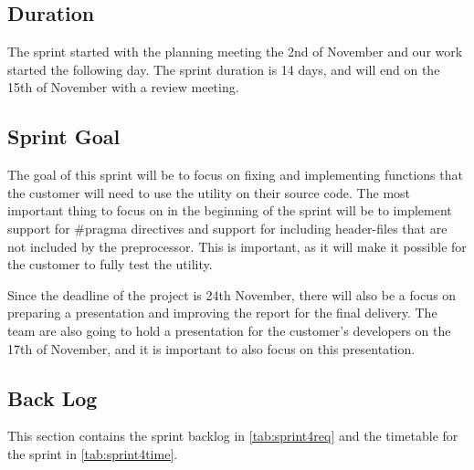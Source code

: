 \subsection{Duration}
The sprint started with the planning meeting the 2nd of November and our work started the following day. The sprint duration is 14 days, and will end on the 15th of November with a review meeting. 

\subsection{Sprint Goal}
The goal of this sprint will be to focus on fixing and implementing functions that the customer will need to use the \gls{utility} on their source code. The most important thing to focus on in the beginning of the sprint will be to implement support for \#pragma directives and support for including \gls{header}-files that are not included by the \gls{preprocessor}. This is important, as it will make it possible for the customer to fully test the \gls{utility}.

Since the deadline of the project is 24th November, there will also be a focus on preparing a presentation and improving the report for the final delivery. The team are also going to hold a presentation for the customer's developers on the 17th of November, and it is important to also focus on this presentation.

\subsection{Back Log}
This section contains the sprint backlog in \autoref{tab:sprint4req} and the timetable for the sprint in \autoref{tab:sprint4time}.  

